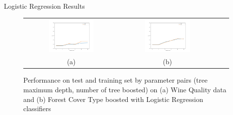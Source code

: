 \documentclass[final]{beamer}
\newlength{\onecolwid}
\newlength{\twocolwid}
\begin{document}
\begin{frame}[t]
\begin{columns}[t]
\begin{column}{\twocolwid}





\begin{columns}[t,totalwidth=\twocolwid] %

\begin{column}{\onecolwid} %


\begin{block}{Logistic Regression Results}
\begin{figure} [H]
    \centering
    \begin{tabular}{cccc}
    \includegraphics[width=0.5\textwidth]{lr-wine-boosted_f1.png}
    & \includegraphics[width=0.5\textwidth]{lr-covtype-boosted_f1.png} \\
    (a) & (b)  \\[6pt]
    \end{tabular}
    \caption{Performance on test and training set by parameter pairs (tree maximum depth, number of tree boosted) on (a) Wine Quality data and (b) Forest Cover Type boosted with Logistic Regression classifiers}
    \label{fig:lr_results}
\end{figure}


\end{block}
\end{column}
\end{columns}
\end{column}
\end{columns}
\end{frame}
\end{document}
